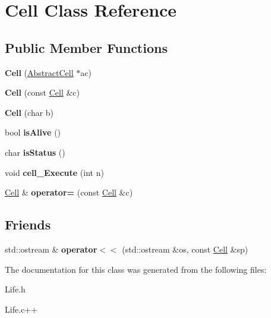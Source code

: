 \hypertarget{classCell}{\section{Cell Class Reference}
\label{classCell}
}
\subsection*{Public Member Functions}
\begin{DoxyCompactItemize}
\item 
\hypertarget{classCell_af87eefd31ef08587611b6ad307a8a020}{{\bfseries Cell} (\hyperlink{classAbstractCell}{Abstract\-Cell} $\ast$ac)}\label{classCell_af87eefd31ef08587611b6ad307a8a020}

\item 
\hypertarget{classCell_a51f477d8039e209153054228a5792b0c}{{\bfseries Cell} (const \hyperlink{classCell}{Cell} \&c)}\label{classCell_a51f477d8039e209153054228a5792b0c}

\item 
\hypertarget{classCell_a0eb8254d3908d403f1475058178816f4}{{\bfseries Cell} (char b)}\label{classCell_a0eb8254d3908d403f1475058178816f4}

\item 
\hypertarget{classCell_a6c8a8a5b7fcc15c9ccea420e35374194}{bool {\bfseries is\-Alive} ()}\label{classCell_a6c8a8a5b7fcc15c9ccea420e35374194}

\item 
\hypertarget{classCell_a44a436396864079b7eddd1df256a93a6}{char {\bfseries is\-Status} ()}\label{classCell_a44a436396864079b7eddd1df256a93a6}

\item 
\hypertarget{classCell_a6aab96fba2b3c8659e8c6f7c4c17a9a6}{void {\bfseries cell\-\_\-\-Execute} (int n)}\label{classCell_a6aab96fba2b3c8659e8c6f7c4c17a9a6}

\item 
\hypertarget{classCell_ab0b7494a321cb288e900cab495b01daa}{\hyperlink{classCell}{Cell} \& {\bfseries operator=} (const \hyperlink{classCell}{Cell} \&c)}\label{classCell_ab0b7494a321cb288e900cab495b01daa}

\end{DoxyCompactItemize}
\subsection*{Friends}
\begin{DoxyCompactItemize}
\item 
\hypertarget{classCell_a89f0c180df69525f61cc2dfc08986171}{std\-::ostream \& {\bfseries operator$<$$<$} (std\-::ostream \&os, const \hyperlink{classCell}{Cell} \&sp)}\label{classCell_a89f0c180df69525f61cc2dfc08986171}

\end{DoxyCompactItemize}


The documentation for this class was generated from the following files\-:\begin{DoxyCompactItemize}
\item 
Life.\-h\item 
Life.\-c++\end{DoxyCompactItemize}
